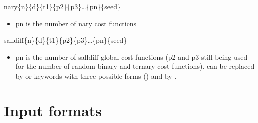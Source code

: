 \documentclass[letterpaper,10pt,openany,oneside,english]{sphinxmanual}
\begin{document}
\begin{description}
\begin{itemize}
\begin{itemize}
\end{itemize}

\sphinxAtStartPar
nary\sphinxhyphen{}\{n\}\sphinxhyphen{}\{d\}\sphinxhyphen{}\{t1\}\sphinxhyphen{}\{p2\}\sphinxhyphen{}\{p3\}…\sphinxhyphen{}\{pn\}\sphinxhyphen{}\{seed\}
\begin{itemize}
\item {} 
\sphinxAtStartPar
pn is the number of n\sphinxhyphen{}ary cost functions

\end{itemize}

\sphinxAtStartPar
salldiff\sphinxhyphen{}\{n\}\sphinxhyphen{}\{d\}\sphinxhyphen{}\{t1\}\sphinxhyphen{}\{p2\}\sphinxhyphen{}\{p3\}…\sphinxhyphen{}\{pn\}\sphinxhyphen{}\{seed\}
\begin{itemize}
\item {} 
\sphinxAtStartPar
pn is the number of salldiff global cost functions (p2 and
p3 still being used for the number of random binary and
ternary cost functions).  can be replaced by
 or  keywords with three possible forms
() and by .

\end{itemize}

\end{itemize}

\end{description}


\chapter{Input formats}
\label{\detokenize{userdoc:input-formats}}\label{\detokenize{userdoc:id56}}
\end{document}
